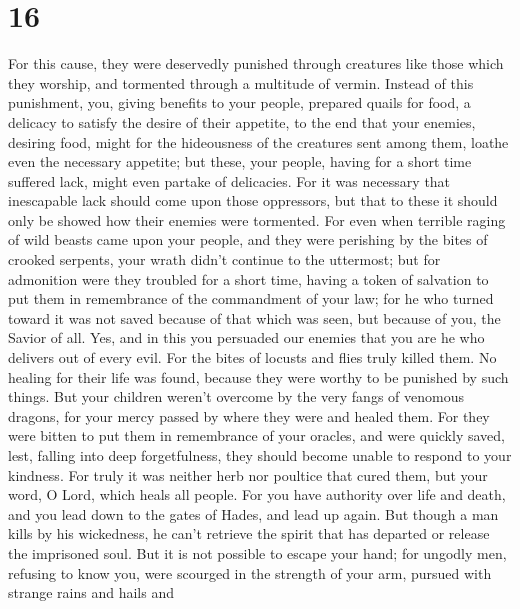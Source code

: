\hypertarget{section-10}{%
\section{16}\label{section-10}}

 For this cause, they were deservedly punished through
creatures like those which they worship, and tormented through a
multitude of vermin.  Instead of this punishment, you,
giving benefits to your people, prepared quails for food, a delicacy to
satisfy the desire of their appetite,  to the end that your
enemies, desiring food, might for the hideousness of the creatures sent
among them, loathe even the necessary appetite; but these, your people,
having for a short time suffered lack, might even partake of delicacies.
 For it was necessary that inescapable lack should come upon
those oppressors, but that to these it should only be showed how their
enemies were tormented.  For even when terrible raging of
wild beasts came upon your people, and they were perishing by the bites
of crooked serpents, your wrath didn't continue to the uttermost;
 but for admonition were they troubled for a short time,
having a token of salvation to put them in remembrance of the
commandment of your law;  for he who turned toward it was
not saved because of that which was seen, but because of you, the Savior
of all.  Yes, and in this you persuaded our enemies that you
are he who delivers out of every evil.  For the bites of
locusts and flies truly killed them. No healing for their life was
found, because they were worthy to be punished by such things.
 But your children weren't overcome by the very fangs of
venomous dragons, for your mercy passed by where they were and healed
them.  For they were bitten to put them in remembrance of
your oracles, and were quickly saved, lest, falling into deep
forgetfulness, they should become unable to respond to your kindness.
 For truly it was neither herb nor poultice that cured
them, but your word, O Lord, which heals all people.  For
you have authority over life and death, and you lead down to the gates
of Hades, and lead up again.  But though a man kills by his
wickedness, he can't retrieve the spirit that has departed or release
the imprisoned soul.  But it is not possible to escape your
hand;  for ungodly men, refusing to know you, were scourged
in the strength of your arm, pursued with strange rains and hails and
